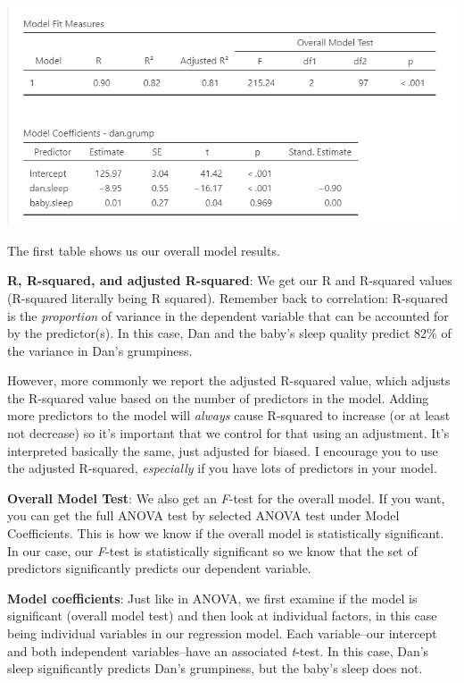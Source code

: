 \documentclass[
]{book}
\begin{document}
\includegraphics{images/13-regression/regression-results.png}

The first table shows us our overall model results.

\textbf{R, R-squared, and adjusted R-squared}: We get our R and R-squared values (R-squared literally being R squared). Remember back to correlation: R-squared is the \emph{proportion} of variance in the dependent variable that can be accounted for by the predictor(s). In this case, Dan and the baby's sleep quality predict 82\% of the variance in Dan's grumpiness.

However, more commonly we report the adjusted R-squared value, which adjusts the R-squared value based on the number of predictors in the model. Adding more predictors to the model will \emph{always} cause R-squared to increase (or at least not decrease) so it's important that we control for that using an adjustment. It's interpreted basically the same, just adjusted for biased. I encourage you to use the adjusted R-squared, \emph{especially} if you have lots of predictors in your model.

\textbf{Overall Model Test}: We also get an \emph{F}-test for the overall model. If you want, you can get the full ANOVA test by selected ANOVA test under Model Coefficients. This is how we know if the overall model is statistically significant. In our case, our \emph{F}-test is statistically significant so we know that the set of predictors significantly predicts our dependent variable.

\textbf{Model coefficients}: Just like in ANOVA, we first examine if the model is significant (overall model test) and then look at individual factors, in this case being individual variables in our regression model. Each variable--our intercept and both independent variables--have an associated \emph{t}-test. In this case, Dan's sleep significantly predicts Dan's grumpiness, but the baby's sleep does not.
\end{document}
